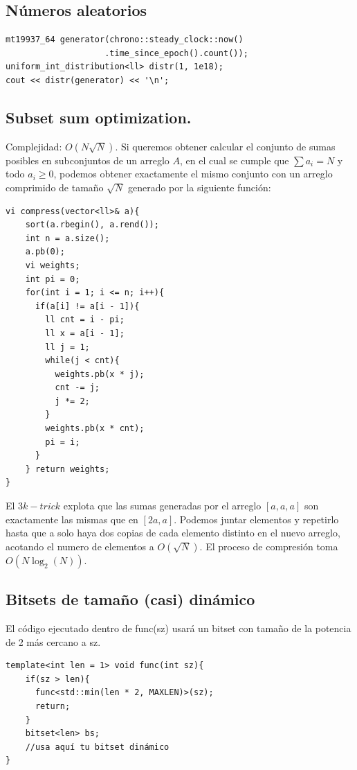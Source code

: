 \documentclass[12 pts,spanish,mexico]{article}
\numberwithin{equation}{section}
\begin{document}
\begin{multicols}{2}
\subsection{Números aleatorios}
\begin{verbatim}
mt19937_64 generator(chrono::steady_clock::now()
                    .time_since_epoch().count());
uniform_int_distribution<ll> distr(1, 1e18);
cout << distr(generator) << '\n';
\end{verbatim}

\subsection{Subset sum optimization.}

Complejidad: $O(N\sqrt{N})$. Si queremos obtener calcular el conjunto de sumas posibles en subconjuntos de un arreglo $A$, en el cual se cumple que $\sum a_i = N$ y todo $a_i\geq0$, podemos obtener exactamente el mismo conjunto con un arreglo comprimido de tamaño $\sqrt{N}$ generado por la siguiente función:

\begin{verbatim}
vi compress(vector<ll>& a){
    sort(a.rbegin(), a.rend());
    int n = a.size();
    a.pb(0);
    vi weights;
    int pi = 0;
    for(int i = 1; i <= n; i++){
      if(a[i] != a[i - 1]){
        ll cnt = i - pi;
        ll x = a[i - 1];
        ll j = 1;
        while(j < cnt){
          weights.pb(x * j);
          cnt -= j;
          j *= 2;
        }
        weights.pb(x * cnt);
        pi = i;
      }
    } return weights;
}
\end{verbatim}

El $3k-trick$ explota que las sumas generadas por el arreglo $[a,a,a]$ son exactamente las mismas que en $[2a,a]$. Podemos juntar elementos y repetirlo hasta que a solo haya dos copias de cada elemento distinto en el nuevo arreglo, acotando el numero de elementos a $O(\sqrt{N})$. El proceso de compresión toma $O(N\log_2(N))$.


\subsection{Bitsets de tamaño (casi) dinámico}

El código ejecutado dentro de func(sz) usará un bitset con tamaño de la potencia de 2 más cercano a sz.

\begin{verbatim}
template<int len = 1> void func(int sz){
    if(sz > len){
      func<std::min(len * 2, MAXLEN)>(sz);
      return;
    }
    bitset<len> bs;
    //usa aquí tu bitset dinámico
}
\end{verbatim}



\end{multicols}
\end{document}
